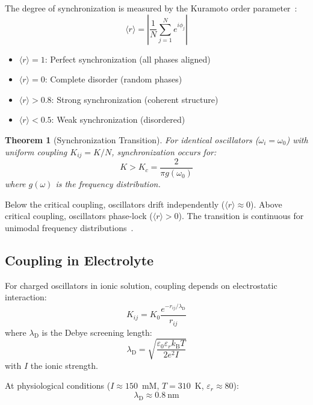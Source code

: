 \documentclass[twocolumn,aps,prb,superscriptaddress,longbibliography,floatfix]{revtex4-2}
\newtheorem{theorem}{Theorem}[section]
\theoremstyle{remark}
\newcommand{\kB}{k_\text{B}}
\newcommand{\orderpar}{\langle r \rangle}
\newcommand{\lambdaD}{\lambda_\text{D}}
\begin{document}
The degree of synchronization is measured by the Kuramoto order
parameter~\cite{Kuramoto1984}:
\begin{equation}
\orderpar = \left| \frac{1}{N} \sum_{j=1}^{N} e^{i\phi_j} \right|
\label{eq:order}
\end{equation}

\begin{itemize}
    \item $\orderpar = 1$: Perfect synchronization (all phases aligned)
    \item $\orderpar = 0$: Complete disorder (random phases)
    \item $\orderpar > 0.8$: Strong synchronization (coherent structure)
    \item $\orderpar < 0.5$: Weak synchronization (disordered)
\end{itemize}

\begin{theorem}[Synchronization Transition]
\label{thm:sync}
For identical oscillators ($\omega_i = \omega_0$) with uniform coupling
$K_{ij} = K/N$, synchronization occurs for:
\begin{equation}
K > K_c = \frac{2}{\pi g(\omega_0)}
\end{equation}
where $g(\omega)$ is the frequency distribution.
\end{theorem}

Below the critical coupling, oscillators drift independently
($\orderpar \approx 0$). Above critical coupling, oscillators phase-lock
($\orderpar > 0$). The transition is continuous for unimodal frequency
distributions~\cite{Strogatz2000}.

\subsection{Coupling in Electrolyte}

For charged oscillators in ionic solution, coupling depends on
electrostatic interaction:
\begin{equation}
K_{ij} = K_0 \frac{e^{-r_{ij}/\lambdaD}}{r_{ij}}
\label{eq:debye_coupling}
\end{equation}
where $\lambdaD$ is the Debye screening length:
\begin{equation}
\lambdaD = \sqrt{\frac{\varepsilon_0 \varepsilon_r \kB T}{2 e^2 I}}
\label{eq:debye}
\end{equation}
with $I$ the ionic strength.

At physiological conditions ($I \approx 150$~mM, $T = 310$~K,
$\varepsilon_r \approx 80$):
\begin{equation}
\lambdaD \approx 0.8~\text{nm}
\end{equation}
\end{document}
